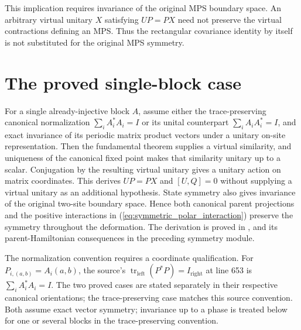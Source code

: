 \documentclass{article}
\begin{document}
This implication requires invariance of the original MPS boundary space.
An arbitrary virtual unitary $X$ satisfying $UP=PX$ need not preserve the
virtual contractions defining an MPS. Thus the rectangular covariance
identity by itself is not substituted for the original MPS symmetry.

\section{The proved single-block case}
For a single already-injective block $A$, assume either the trace-preserving
canonical normalization $\sum_i A_i^*A_i=I$ or its unital counterpart
$\sum_i A_iA_i^*=I$, and exact invariance of its periodic
matrix product vectors under a unitary on-site representation. Then
the fundamental theorem supplies a virtual similarity, and uniqueness of
the canonical fixed point makes that similarity unitary up to a scalar.
Conjugation by the resulting virtual unitary gives a unitary action on
matrix coordinates. This derives $UP=PX$ and $[U,Q]=0$ without supplying
a virtual unitary as an additional hypothesis. State symmetry also gives
invariance of the original two-site boundary space. Hence both canonical
parent projections and the positive interactions in
(\ref{eq:symmetric_polar_interaction}) preserve the symmetry throughout
the deformation. The derivation is proved in
,
and its parent-Hamiltonian consequences in the preceding symmetry module.

The normalization convention requires a coordinate qualification.
For $P_{i,(a,b)}=A_i(a,b)$, the source's
$\operatorname{tr}_{\mathrm{left}}(P^*P)=I_{\mathrm{right}}$ at line 653
is $\sum_i A_i^*A_i=I$. The two proved cases are stated separately in their
respective canonical orientations; the trace-preserving case matches this
source convention. Both assume exact vector symmetry; invariance up to a
phase is treated below for one or several blocks in the trace-preserving
convention.
\end{document}
